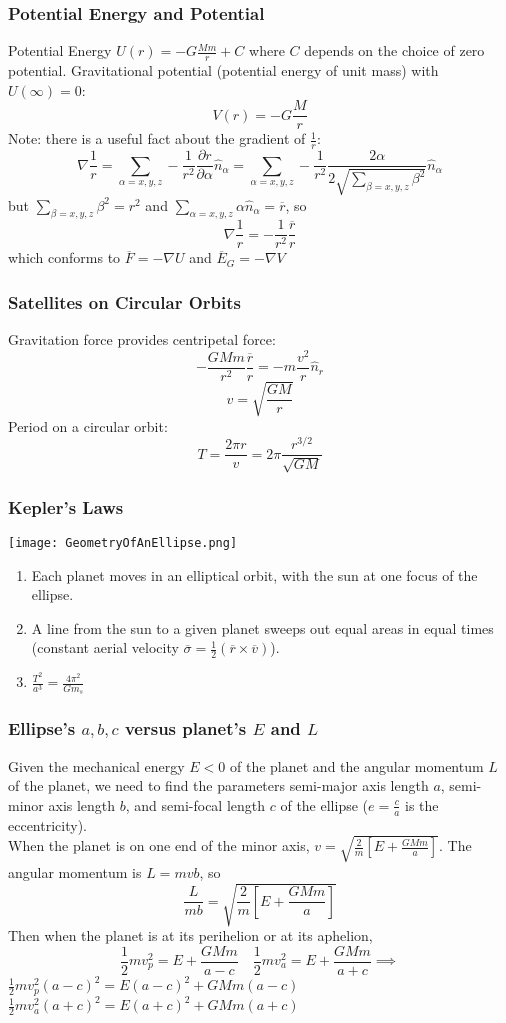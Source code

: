 \begin{frame}
\frametitle{Potential Energy and Potential}
Potential Energy $U(r)=-G\frac{Mm}{r}+C$ where $C$ depends on the choice of zero potential.
Gravitational potential (potential energy of unit mass) with $U(\infty)=0$:
\[V(r)=-G\frac{M}{r}\]
Note: there is a useful fact about the \alert{gradient} of $\frac{1}{r}$: \[\nabla \frac{1}{r}=\sum_{\alpha=x,y,z}-\frac{1}{r^2}\frac{\partial r}{\partial \alpha}\hat n_\alpha=\sum_{\alpha=x,y,z}-\frac{1}{r^2}\frac{2\alpha}{2\sqrt{\sum_{\beta=x,y,z}\beta^2}}\hat n_\alpha\]
but $\sum_{\beta=x,y,z}\beta^2=r^2$ and $\sum_{\alpha=x,y,z}\alpha\hat n_\alpha=\overline r$, so
\[\nabla \frac{1}{r}=-\frac{1}{r^2}\frac{\overline r}{r}\]
which conforms to $\overline F=-\nabla U$ and $\overline E_G=-\nabla V$
\end{frame}
\begin{frame}
\frametitle{Satellites on Circular Orbits}
Gravitation force provides centripetal force:
\[-\frac{GMm}{r^2}\frac{\overline r}{r}=-m\frac{v^2}{r}\hat n_r\]
\[v=\sqrt{\frac{GM}{r}}\]
Period on a circular orbit:
\[T=\frac{2\pi r}{v}=2\pi\frac{r^{3/2}}{\sqrt{GM}}\]
\end{frame}
\begin{frame}
\frametitle{Kepler's Laws}
\begin{multicols}{2}
\texttt{[image: GeometryOfAnEllipse.png]}\\
\begin{enumerate}
\item Each planet moves in an elliptical orbit, with the sun at one focus of the \alert{ellipse}.
\item A line from the sun to a given planet sweeps out equal areas in equal times (constant \alert{aerial velocity} $\overline\sigma=\frac{1}{2}(\overline r\times\overline v)$).
\item {$\frac{T^2}{a^3}=\frac{4\pi^2}{Gm_s}$}
\end{enumerate}
\end{multicols}
\end{frame}
\begin{frame}
\frametitle{Ellipse's $a,b,c$ versus planet's $E$ and $L$}
Given the \alert{mechanical energy} $E<0$ of the planet and the \alert{angular momentum} $L$ of the planet, we need to find the parameters semi-major axis length $a$, semi-minor axis length $b$, and semi-focal length $c$ of the ellipse ($e=\frac{c}{a}$ is the eccentricity).\\
When the planet is on one end of the minor axis, $v=\sqrt{\frac{2}{m}\left[E+\frac{GMm}{a}\right]}$. The angular momentum is $L=mvb$, so
\[\frac{L}{mb}=\sqrt{\frac{2}{m}\left[E+\frac{GMm}{a}\right]}\]
Then when the planet is at its perihelion or at its aphelion,
\[\frac{1}{2}mv_p^2=E+\frac{GMm}{a-c}\quad\frac{1}{2}mv_a^2=E+\frac{GMm}{a+c}\implies\]
$\frac{1}{2}mv_p^2(a-c)^2=E(a-c)^2+GMm(a-c)$\\$\frac{1}{2}mv_a^2(a+c)^2=E(a+c)^2+GMm(a+c)$
\end{frame}
